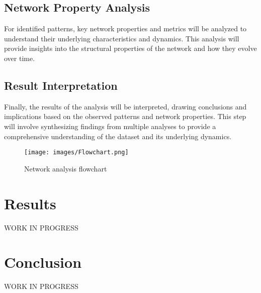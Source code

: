 \documentclass[conference]{IEEEtran}
\begin{document}
\subsection{Network Property Analysis}
For identified patterns, key network properties and metrics will be analyzed to understand their underlying characteristics and dynamics. This analysis will provide insights into the structural properties of the network and how they evolve over time.

\subsection{Result Interpretation}
Finally, the results of the analysis will be interpreted, drawing conclusions and implications based on the observed patterns and network properties. This step will involve synthesizing findings from multiple analyses to provide a comprehensive understanding of the dataset and its underlying dynamics.

\begin{figure}
    \centering
    \texttt{[image: images/Flowchart.png]}
    \caption{Network analysis flowchart}
    \label{fig:flowchart}
\end{figure}

\section{Results}

WORK IN PROGRESS

\section{Conclusion}

WORK IN PROGRESS
\end{document}
